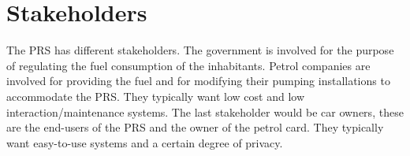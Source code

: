 \section{Stakeholders}
The PRS has different stakeholders. The government is involved for the purpose of regulating the fuel consumption of the inhabitants. Petrol companies are involved for providing the fuel and for modifying their pumping installations to accommodate the PRS. They typically want low cost and low interaction/maintenance systems. The last stakeholder would be car owners, these are the end-users of the PRS and the owner of the petrol card. They typically want easy-to-use systems and a certain degree of privacy. 
